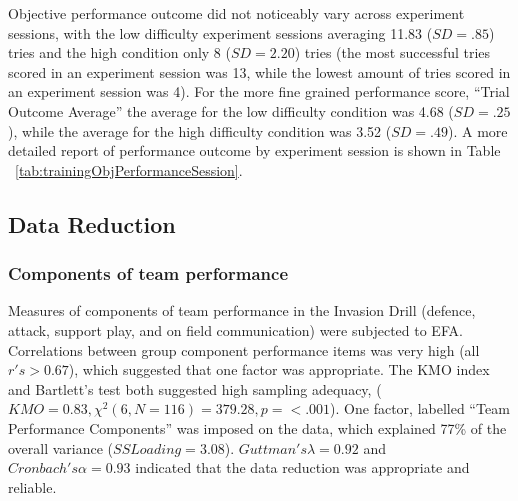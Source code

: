\begin{CJK}{UTF8}{gbsn}
Objective performance outcome did not noticeably vary across experiment sessions, with the low difficulty experiment sessions averaging 11.83 ($SD = .85$) tries and the high condition only 8 ($SD = 2.20$) tries (the most successful tries scored in an experiment session was 13, while the lowest amount of tries scored in an experiment session was 4).  For the more fine grained performance score, ``Trial Outcome Average'' the average for the low difficulty condition was 4.68 ($SD = .25$), while the average for the high difficulty condition was 3.52 ($SD = .49$). A more detailed report of performance outcome by experiment session is shown in Table ~\ref{tab:trainingObjPerformanceSession}.














\subsection{Data Reduction}

\subsubsection{Components of team performance}
Measures of components of team performance in the Invasion Drill (defence, attack, support play, and on field communication) were subjected to EFA.  Correlations between group component performance items was very high (all $r's > 0.67$), which suggested that one factor was appropriate.  The KMO index and Bartlett's test both suggested high sampling adequacy, ($KMO =  0.83, \chi^2(6, N = 116) = 379.28, p = <.001$).  One factor, labelled ``Team Performance Components'' was imposed on the data, which explained 77\% of the overall variance ($SS Loading = 3.08$).  $Guttman's \lambda = 0.92$ and $Cronbach's \alpha = 0.93$ indicated that the data reduction was appropriate and reliable.


\end{CJK}
